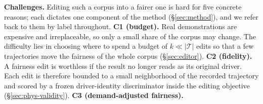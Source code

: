 \textbf{Challenges.} Editing such a corpus into a fairer one is hard for five
concrete reasons; each dictates one component of the method
(\S\ref{sec:method}), and we refer back to them by label throughout.
\textbf{C1 (budget).} Real demonstrations are expensive and irreplaceable, so
only a small share of the corpus may change. The difficulty lies in choosing where to spend
a budget of $k \ll |\mathcal{T}|$ edits so that a few trajectories move the
fairness of the whole corpus (\S\ref{sec:editor}).
\textbf{C2 (fidelity).} A fairness edit is worthless if the result no longer
reads as its original driver. Each edit is therefore bounded to a small
neighborhood of the recorded trajectory and scored by a frozen driver-identity
discriminator inside the editing objective (\S\ref{sec:phys-validity}).
\textbf{C3 (de\-mand-ad\-just\-ed fairness).}
